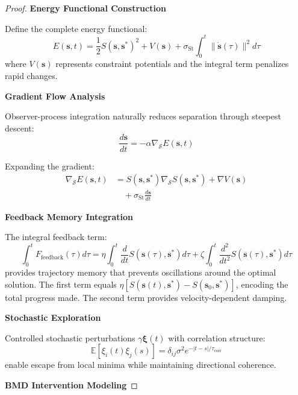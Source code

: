 \documentclass[11pt]{article}
\theoremstyle{definition}
\theoremstyle{remark}
\newcommand{\Expectation}{\mathbb{E}}
\newcommand{\SEntropy}{\mathcal{S}}
\newcommand{\StellasConstant}{\sigma_{\text{St}}}
\begin{document}
\begin{proof}
\textbf{Energy Functional Construction}

Define the complete energy functional:
\begin{equation}
E(\mathbf{s}, t) = \frac{1}{2} S(\mathbf{s}, \mathbf{s}^*)^2 + V(\mathbf{s}) + \StellasConstant \int_0^t \|\dot{\mathbf{s}}(\tau)\|^2 d\tau
\end{equation}
where $V(\mathbf{s})$ represents constraint potentials and the integral term penalizes rapid changes.

\textbf{Gradient Flow Analysis}

Observer-process integration naturally reduces separation through steepest descent:
\begin{equation}
\frac{d\mathbf{s}}{dt} = -\alpha \nabla_{\SEntropy} E(\mathbf{s}, t)
\end{equation}

Expanding the gradient:
\begin{align}
\nabla_{\SEntropy} E(\mathbf{s}, t) &= S(\mathbf{s}, \mathbf{s}^*) \nabla_{\SEntropy} S(\mathbf{s}, \mathbf{s}^*) + \nabla V(\mathbf{s}) \\
&\quad + \StellasConstant \frac{d\mathbf{s}}{dt}
\end{align}

\textbf{Feedback Memory Integration}

The integral feedback term:
\begin{equation}
\int_0^t F_{\text{feedback}}(\tau) d\tau = \eta \int_0^t \frac{d}{dt} S(\mathbf{s}(\tau), \mathbf{s}^*) d\tau + \zeta \int_0^t \frac{d^2}{dt^2} S(\mathbf{s}(\tau), \mathbf{s}^*) d\tau
\end{equation}
provides trajectory memory that prevents oscillations around the optimal solution. The first term equals $\eta [S(\mathbf{s}(t), \mathbf{s}^*) - S(\mathbf{s}_0, \mathbf{s}^*)]$, encoding the total progress made. The second term provides velocity-dependent damping.

\textbf{Stochastic Exploration}

Controlled stochastic perturbations $\gamma \mathbf{\xi}(t)$ with correlation structure:
\begin{equation}
\Expectation[\xi_i(t) \xi_j(s)] = \delta_{ij} \sigma^2 e^{-|t-s|/\tau_{\text{corr}}}
\end{equation}
enable escape from local minima while maintaining directional coherence.

\textbf{BMD Intervention Modeling}


\end{proof}
\end{document}

